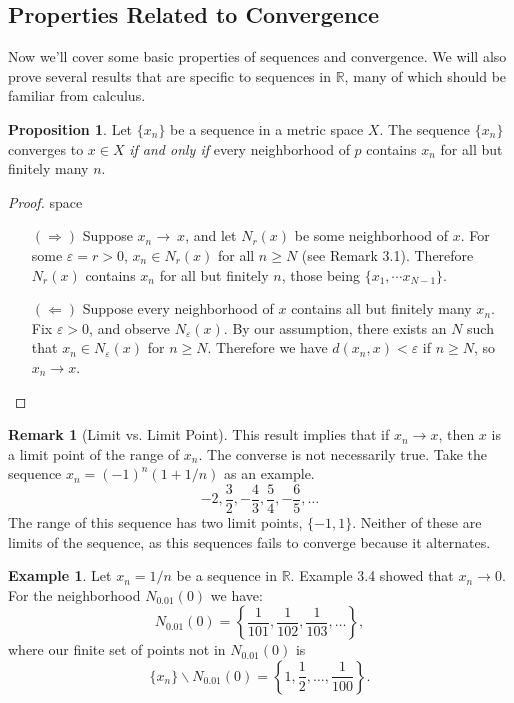 \documentclass{article}
\newcommand{\R}{\mathbb{R}}
\theoremstyle{definition}
\newtheorem{proposition}{Proposition}[section]
\newtheorem{example}{Example}[section]
\newtheorem{remark}{Remark}[section]
\begin{document}
	\subsection{Properties Related to Convergence}
	Now we'll cover some basic properties of sequences and convergence. We will also prove several results that are specific to sequences in $ \R $, many of which should be familiar from calculus. 
	\begin{proposition}
		Let $ \{x_n\} $ be a sequence in a metric space $ X $. The sequence $ \{x_n\} $ converges to $ x\in X $ \textit{if and only if} every neighborhood of $ p $ contains $ x_n $ for all but finitely many $ n $.  
	\end{proposition}
	\begin{proof}{\color{white}space}
		\begin{enumerate}
			\item [$ (\Longrightarrow) $] Suppose $ x_n\to\ x $, and let $ N_r(x) $ be some neighborhood of $ x $. For some $ \varepsilon=r>0 $, $ x_n\in N_r(x) $ for all $ n\ge N $ (see Remark 3.1). Therefore $ N_r(x) $ contains $ x_n $ for all but finitely $ n $, those being $ \{x_1,\cdots x_{N-1}\} $.  
			\item [$ (\Longleftarrow) $] Suppose every neighborhood of $ x $ contains all but finitely many $ x_n $. Fix $ \varepsilon >0 $, and observe $ N_\varepsilon(x) $. By our assumption, there exists an $ N $ such that $ x_n\in N_\varepsilon(x) $ for $ n\ge N $. Therefore we have $ d(x_n,x)<\varepsilon $ if $ n\ge N $, so $ x_n\to x $.   
		\end{enumerate}
	\end{proof}
	\begin{remark}[Limit vs. Limit Point]
		This result implies that if $ x_n\to x $, then $ x $ is a limit point of the range of $ x_n $. The converse is not necessarily true. Take the sequence $ x_n=(-1)^n(1+1/n) $ as an example. $$-2, \frac{3}{2}, -\frac{4}{3},\frac{5}{4},-\frac{6}{5},\ldots $$ The range of this sequence has two limit points, $ \{-1,1\} $. Neither of these are limits of the sequence, as this sequences fails to converge because it alternates. 
	\end{remark}
	\begin{example}
		Let $ x_n=1/n $ be a sequence in $ \R $. Example 3.4 showed that $ x_n\to 0 $. For the neighborhood $ N_{0.01}(0) $ we have: $$ N_{0.01}(0)=\left\{\frac{1}{101},\frac{1}{102},\frac{1}{103},\ldots\right\}, $$ where our finite set of points not in $ N_{0.01}(0) $ is $$\{x_n\}\backslash N_{0.01}(0)=\left\{1,\frac{1}{2},\ldots, \frac{1}{100}\right\}.$$
	\end{example}
\end{document}
